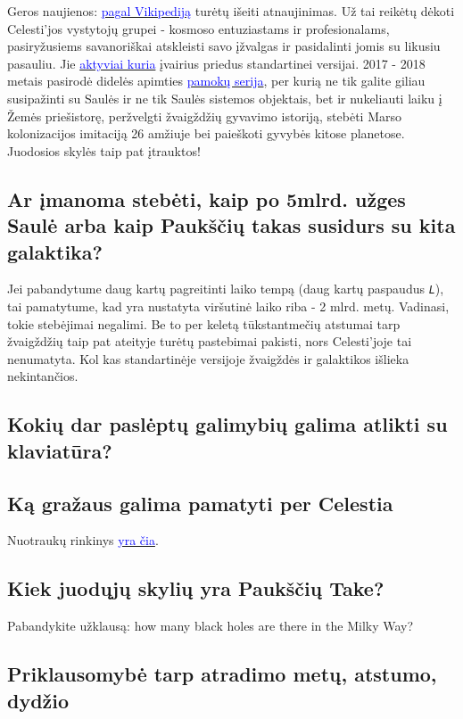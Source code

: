 \documentclass[a4paper]{article}
\newcommand{\goto}[2]{\href{\detokenize{#1}}{\textcolor{blue}{#2}}}
\begin{document}
Geros naujienos: \goto{https://en.wikipedia.org/wiki/Celestia}{pagal Vikipediją} turėtų išeiti atnaujinimas. Už tai reikėtų dėkoti Celesti'jos vystytojų grupei - kosmoso entuziastams ir profesionalams, pasiryžusiems savanoriškai atskleisti savo įžvalgas ir pasidalinti jomis su likusiu pasauliu. Jie \goto{http://www.celestiamotherlode.net/}{aktyviai kuria} įvairius priedus standartinei versijai. 2017 - 2018 metais pasirodė didelės apimties \goto{http://www.celestiamotherlode.net/catalog/educational.php}{pamokų serija}, per kurią ne tik galite giliau susipažinti su Saulės ir ne tik Saulės sistemos objektais, bet ir nukeliauti laiku į Žemės priešistorę, peržvelgti žvaigždžių gyvavimo istoriją, stebėti Marso kolonizacijos imitaciją 26 amžiuje bei paieškoti gyvybės kitose planetose. Juodosios skylės taip pat įtrauktos!
 
\subsection*{Ar įmanoma stebėti, kaip po 5mlrd. užges Saulė arba kaip Paukščių takas susidurs su kita galaktika?}
 
Jei pabandytume daug kartų pagreitinti laiko tempą (daug kartų paspaudus \texttt{\textit{L}}), tai pamatytume, kad yra nustatyta viršutinė laiko riba - 2 mlrd. metų. Vadinasi, tokie stebėjimai negalimi. Be to  per keletą tūkstantmečių atstumai tarp žvaigždžių taip pat ateityje turėtų pastebimai pakisti, nors Celesti'joje tai nenumatyta. Kol kas standartinėje versijoje žvaigždės ir galaktikos išlieka nekintančios.

\subsection*{Kokių dar paslėptų galimybių galima atlikti su klaviatūra?}

\subsection*{Ką gražaus galima pamatyti per Celestia}

Nuotraukų rinkinys \goto{https://celestia.space/gallery.html}{yra čia}.

\subsection*{Kiek juodųjų skylių yra Paukščių Take?}

Pabandykite užklausą: how many black holes are there in the Milky Way?

\subsection*{Priklausomybė tarp atradimo metų, atstumo, dydžio}
\end{document}
